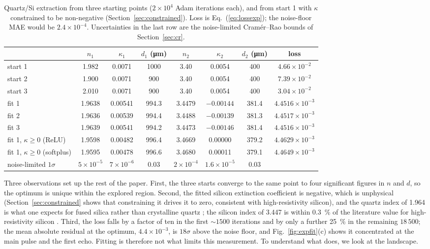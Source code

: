 \documentclass{optica-article}
\newcommand{\kap}{\kappa}
\begin{document}
\begin{table}[htb]\centering\small
  \caption{Quartz/Si extraction from three starting points ($2\times10^4$ Adam iterations each), and from start 1 with $\kap$ constrained to be non-negative (Section~\ref{sec:constrained}). Loss is Eq.~(\ref{eq:lossexp}); the noise-floor MAE would be $2.4\times10^{-4}$. Uncertainties in the last row are the noise-limited Cram\'er--Rao bounds of Section~\ref{sec:cr}.}
  \label{tab:exp}
  \begin{tabular}{l cccccc c}\toprule
    & $n_1$ & $\kap_1$ & $d_1$ (\si{\micro\metre}) & $n_2$ & $\kap_2$ & $d_2$ (\si{\micro\metre}) & loss\\\midrule
    start 1 & 1.982 & 0.0071 & 1000 & 3.40 & 0.0054 & 400 & $4.66\times10^{-2}$\\
    start 2 & 1.900 & 0.0071 & 900  & 3.40 & 0.0054 & 400 & $7.39\times10^{-2}$\\
    start 3 & 2.010 & 0.0071 & 900  & 3.40 & 0.0054 & 400 & $3.04\times10^{-2}$\\\midrule
    fit 1 & 1.9638 & 0.00541 & 994.3 & 3.4479 & $-0.00144$ & 381.4 & $4.4516\times10^{-3}$\\
    fit 2 & 1.9636 & 0.00539 & 994.4 & 3.4488 & $-0.00139$ & 381.3 & $4.4517\times10^{-3}$\\
    fit 3 & 1.9639 & 0.00541 & 994.2 & 3.4473 & $-0.00146$ & 381.4 & $4.4516\times10^{-3}$\\\midrule
    fit 1, $\kap\ge0$ (ReLU)     & 1.9598 & 0.00482 & 996.4 & 3.4669 & 0.00000 & 379.2 & $4.4629\times10^{-3}$\\
    fit 1, $\kap\ge0$ (softplus) & 1.9595 & 0.00478 & 996.6 & 3.4680 & 0.00011 & 379.1 & $4.4649\times10^{-3}$\\\midrule
    noise-limited $1\sigma$ & $5\times10^{-5}$ & $7\times10^{-6}$ & 0.03 & $2\times10^{-4}$ & $1.6\times10^{-5}$ & 0.03 & \\
    \bottomrule
  \end{tabular}
\end{table}

Three observations set up the rest of the paper. First, the three starts converge to the same point to four significant figures in $n$ and $d$, so the optimum is unique within the explored region. Second, the fitted silicon extinction coefficient is negative, which is unphysical (Section~\ref{sec:constrained} shows that constraining it drives it to zero, consistent with high-resistivity silicon), and the quartz index of 1.964 is what one expects for fused silica \cite{Grischkowsky1990,Naftaly2007} rather than crystalline quartz ; the silicon index of 3.447 is within \SI{0.3}{\percent} of the literature value for high-resistivity silicon \cite{Dai2004}. Third, the loss falls by a factor of ten in the first $\sim1500$ iterations and by only a further \SI{25}{\percent} in the remaining $18\,500$; the mean absolute residual at the optimum, $4.4\times10^{-3}$, is $18\sigma$ above the noise floor, and Fig.~\ref{fig:expfit}(c) shows it concentrated at the main pulse and the first echo. Fitting is therefore not what limits this measurement. To understand what does, we look at the landscape.
\end{document}
